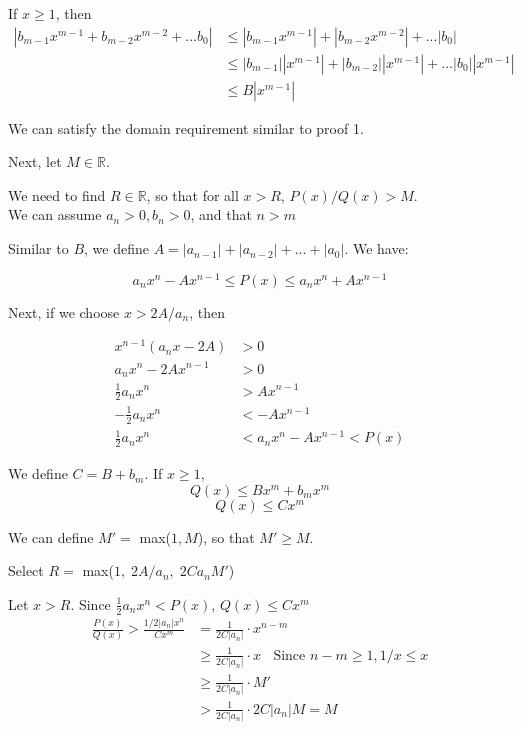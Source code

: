 \documentclass{article}
\begin{document}
If $x\geq 1$, then
\begin{align*}
  |b_{m-1} x^{m-1} + b_{m-2} x^{m-2} + ... b_0| &\leq |b_{m-1} x^{m-1}| + |b_{m-2} x^{m-2}| +... |b_0|\\
                                                &\leq |b_{m-1}||x^{m-1}| + |b_{m-2}||x^{m-1}| +... |b_0||x^{m-1}|\\
                                                &\leq B|x^{m-1}|
\end{align*}

We can satisfy the domain requirement similar to proof 1.

Next, let $M \in \mathbb{R}$.

We need to find $R\in \mathbb{R}$, so that for all $x > R$, $ P(x)/Q(x) > M$.\\

We can assume $a_n > 0, b_n > 0$, and that $n > m$

Similar to $B$, we define $A = |a_{n-1}| + |a_{n-2}| + ... + |a_0|$. We have:

$$a_n x^n - Ax^{n-1} \leq P(x) \leq a_nx^n + Ax^{n-1}$$

Next, if we choose $x > 2A/a_n$, then

\begin{align*}
  x^{n-1}(a_n x - 2A) &> 0\\
  a_n x^n - 2A x^{n-1} &> 0\\
  \frac{1}{2} a_n x^n &> A x^{n-1}\\
  - \frac{1}{2} a_n x^n &< -A x^{n-1}\\
  \frac{1}{2} a_n x^n &< a_n x^n -A x^{n-1}< P(x)
\end{align*}

We define $C = B + b_m$. If $x\geq 1$,
$$ Q(x) \leq Bx^m + b_m x^m$$
$$ Q(x) \leq Cx^m$$

We can define $M' = $ max($1,M$), so that $M' \geq M$.

Select $R = $ max($1, \; 2A/a_n, \; 2Ca_nM'$)
\medskip

Let $x>R$.
Since $\frac{1}{2} a_n x^n < P(x)$,
$Q(x) \leq Cx^m$
\begin{align*}
  \frac{P(x)}{Q(x)} > \frac{1/2 |a_n|x^n}{Cx^m} &= \frac{1}{2C|a_n|} \cdot x^{n-m}\\
                                                  &\geq \frac{1}{2C|a_n|} \cdot x \;\; \text{  Since   } n-m \geq 1, 1/x \leq x\\                               &\geq \frac{1}{2C|a_n|} \cdot M'\\
                                                  &> \frac{1}{2C|a_n|} \cdot 2C|a_n|M = M
\end{align*}
\end{document}
